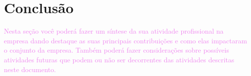 \section{Conclusão}
\label{sec:conclusao}

\textcolor{violet}{Nesta seção você poderá fazer um síntese da sua atividade profissional na empresa dando destaque as suas principais contribuições e como elas impactaram o conjunto da empresa. Também poderá fazer considerações sobre possíveis atividades futuras que podem ou não ser decorrentes das atividades descritas neste documento.}
\newpage

